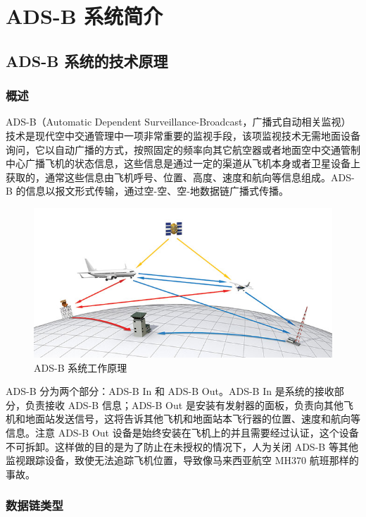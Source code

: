 
\chapter{ADS-B 系统简介}

\section{ADS-B 系统的技术原理}

\subsection{概述}

ADS-B（Automatic Dependent Surveillance-Broadcast，广播式自动相关监视）技术是现代空中交通管理中一项非常重要的监视手段，该项监视技术无需地面设备询问，它以自动广播的方式，按照固定的频率向其它航空器或者地面空中交通管制中心广播飞机的状态信息，这些信息是通过一定的渠道从飞机本身或者卫星设备上获取的，通常这些信息由飞机呼号、位置、高度、速度和航向等信息组成。ADS-B 的信息以报文形式传输，通过空-空、空-地数据链广播式传播。

\begin{figure}[htbp]
\centering
\includegraphics[width=13cm]{pic/Advocacy_ADS_B.jpg}
\caption{ADS-B 系统工作原理}
\label{fig:Advocacy_ADS_B}
\end{figure}

ADS-B 分为两个部分：ADS-B In 和 ADS-B Out。ADS-B In 是系统的接收部分，负责接收 ADS-B 信息；ADS-B Out 是安装有发射器的面板，负责向其他飞机和地面站发送信号，这将告诉其他飞机和地面站本飞行器的位置、速度和航向等信息。注意 ADS-B Out 设备是始终安装在飞机上的并且需要经过认证，这个设备不可拆卸。这样做的目的是为了防止在未授权的情况下，人为关闭 ADS-B 等其他监视跟踪设备，致使无法追踪飞机位置，导致像马来西亚航空 MH370 航班那样的事故。

\subsection{数据链类型}


